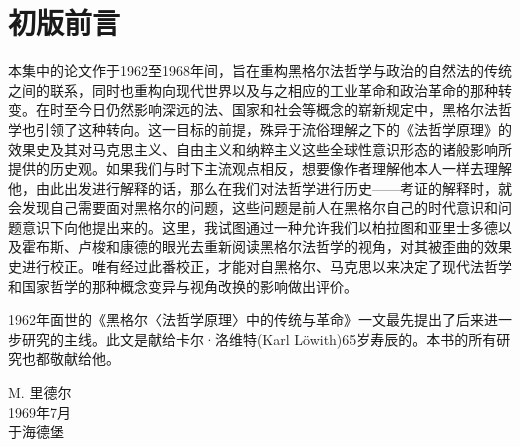 \chapter*{初版前言}

本集中的论文作于1962至1968年间，旨在重构黑格尔法哲学与政治的自然法的传统之间的联系，同时也重构向现代世界以及与之相应的工业革命和政治革命的那种转变。在时至今日仍然影响深远的法、国家和社会等概念的崭新规定中，黑格尔法哲学也引领了这种转向。这一目标的前提，殊异于流俗理解之下的《法哲学原理》的效果史及其对马克思主义、自由主义和纳粹主义这些全球性意识形态的诸般影响所提供的历史观。如果我们与时下主流观点相反，想要像作者理解他本人一样去理解他，由此出发进行解释的话，那么在我们对法哲学进行历史——考证的解释时，就会发现自己需要面对黑格尔的问题，这些问题是前人在黑格尔自己的时代意识和问题意识下向他提出来的。这里，我试图通过一种允许我们以柏拉图和亚里士多德以及霍布斯、卢梭和康德的眼光去重新阅读黑格尔法哲学的视角，对其被歪曲的效果史进行校正。唯有经过此番校正，才能对自黑格尔、马克思以来决定了现代法哲学和国家哲学的那种概念变异与视角改换的影响做出评价。

1962年面世的《黑格尔〈法哲学原理〉中的传统与革命》一文最先提出了后来进一步研究的主线。此文是献给卡尔·洛维特(Karl Löwith)65岁寿辰的。本书的所有研究也都敬献给他。

\begin{flushright}
M. 里德尔\\
1969年7月\\
于海德堡
\end{flushright}
